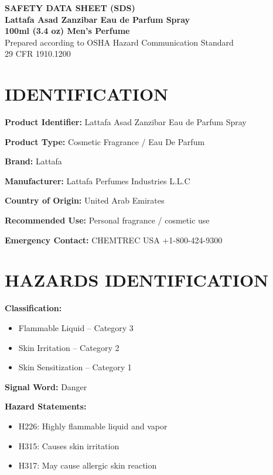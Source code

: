 \documentclass[11pt]{article}
\begin{document}
\begin{center}
{\LARGE \textbf{SAFETY DATA SHEET (SDS)}}\\[6pt]
{\Large \textbf{Lattafa Asad Zanzibar Eau de Parfum Spray}}\\
{\large \textbf{100ml (3.4 oz) Men's Perfume}}\\[6pt]
Prepared according to OSHA Hazard Communication Standard\\
29 CFR 1910.1200
\end{center}

\vspace{10pt}

\section{IDENTIFICATION}

\textbf{Product Identifier:} Lattafa Asad Zanzibar Eau de Parfum Spray

\textbf{Product Type:} Cosmetic Fragrance / Eau De Parfum

\textbf{Brand:} Lattafa

\textbf{Manufacturer:} Lattafa Perfumes Industries L.L.C

\textbf{Country of Origin:} United Arab Emirates

\textbf{Recommended Use:} Personal fragrance / cosmetic use

\textbf{Emergency Contact:} CHEMTREC USA +1-800-424-9300

\section{HAZARDS IDENTIFICATION}

\textbf{Classification:}
\begin{itemize}[noitemsep]
    \item Flammable Liquid -- Category 3
    \item Skin Irritation -- Category 2
    \item Skin Sensitization -- Category 1
\end{itemize}

\textbf{Signal Word:} Danger

\textbf{Hazard Statements:}
\begin{itemize}[noitemsep]
    \item H226: Highly flammable liquid and vapor
    \item H315: Causes skin irritation
    \item H317: May cause allergic skin reaction
\end{itemize}
\end{document}
